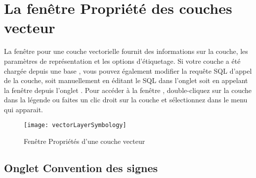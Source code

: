 \section{La fenêtre Propriété des couches vecteur}\label{sec:vectorprops}

La fenêtre  pour une couche vectorielle fournit des informations sur la couche, les paramètres de représentation et les options d'étiquetage. Si votre couche a été chargée depuis une base \ppg, vous pouvez également modifier la requête SQL d'appel de la couche, soit manuellement en éditant le SQL dans l'onglet  soit en appelant la fenêtre  depuis l'onglet . Pour accéder à la fenêtre , double-cliquez sur la couche dans la légende ou faites un clic droit sur la couche et sélectionnez  dans le menu qui apparait.

\begin{figure}[ht]
  \begin{center}
  \texttt{[image: vectorLayerSymbology]}
  \caption{Fenêtre Propriétés d'une couche vecteur \nixcaption}\label{fig:vector_symbology}
\end{center}
\end{figure}

\subsection{Onglet Convention des signes}\label{sec:symbology}

